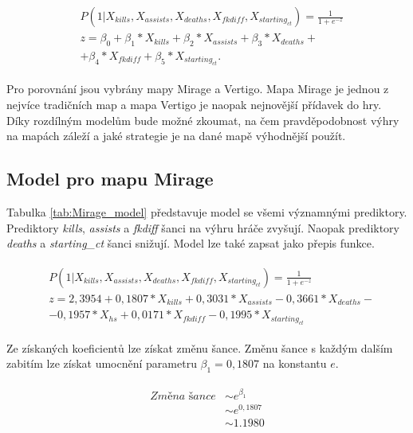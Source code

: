 \begin{align*}
    \begin{split}
        &P(1 | X_{kills}, X_{assists}, X_{deaths}, X_{fkdiff}, X_{starting_{ct}}) = \frac{1}{1 + e^{-z}} \\
        &z = \beta_0 + \beta_1*X_{kills} + \beta_2*X_{assists} + \beta_3*X_{deaths} + \\
        &+ \beta_4*X_{fkdiff} + \beta_5*X_{starting_{ct}}.
    \end{split}
\end{align*}

Pro porovnání jsou vybrány mapy Mirage a Vertigo. Mapa Mirage je jednou z nejvíce tradičních map a mapa Vertigo je naopak nejnovější přídavek do hry.
Díky rozdílným modelům bude možné zkoumat, na čem pravděpodobnost výhry na mapách záleží a jaké strategie je na dané mapě výhodnější použít.

\subsection{Model pro mapu Mirage}



Tabulka \ref{tab:Mirage_model} představuje model se všemi významnými prediktory. Prediktory \textit{kills}, \textit{assists} a \textit{fkdiff} šanci na výhru
hráče zvyšují. Naopak prediktory \textit{deaths} a \textit{starting\_ct} šanci snižují. Model lze také zapsat jako přepis funkce.

\begin{align}
    \begin{split}
        &P(1 | X_{kills}, X_{assists}, X_{deaths}, X_{fkdiff}, X_{starting_{ct}}) = \frac{1}{1 + e^{-z}} \\
        &z = 2,3954 + 0,1807*X_{kills} + 0,3031*X_{assists} - 0,3661*X_{deaths} - \\
        &- 0,1957*X_{hs} + 0,0171*X_{fkdiff} - 0,1995*X_{starting_{ct}}
    \end{split}
\end{align}

Ze získaných koeficientů lze získat změnu šance. Změnu šance s každým dalším zabitím lze získat umocnění parametru $\beta_1 = 0,1807$ na konstantu $e$.

\begin{align}
    \begin{split}
        \textit{Změna šance} &\sim e^{\beta_1} \\
                             &\sim e^{0,1807} \\
                             &\sim 1.1980
    \end{split}
\end{align}


